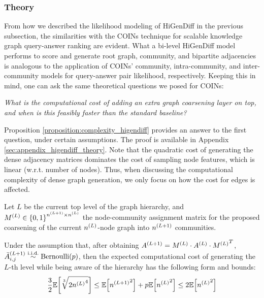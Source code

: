 \begin{itemize}
\end{itemize}

\subsubsection{Theory}
From how we described the likelihood modeling of HiGenDiff in the previous subsection, the similarities with the COINs technique for scalable knowledge graph query-answer ranking are evident. What a bi-level HiGenDiff model performs to score and generate root graph, community, and bipartite adjacencies is analogous to the application of COINs' community, intra-community, and inter-community models for query-answer pair likelihood, respectively. Keeping this in mind, one can ask the same theoretical questions we posed for COINs: 
\begin{center}
    \emph{What is the computational cost of adding an extra graph coarsening layer on top, and when is this feasibly faster than the standard baseline?}
\end{center}
Proposition \ref{proposition:complexity_higendiff} provides an answer to the first question, under certain assumptions. The proof is available in Appendix \ref{sec:appendix_higendiff_theory}. Note that the quadratic cost of generating the dense adjacency matrices dominates the cost of sampling node features, which is linear (w.r.t. number of nodes). Thus, when discussing the computational complexity of dense graph generation, we only focus on how the cost for edges is affected.

\begin{proposition}
    \label{proposition:complexity_higendiff}
    Let $L$ be the current top level of the graph hierarchy, and $M^{\mathopen{}\left(L\right)} \in \mathopen{}\left\{0,1\right\}^{n^{\mathopen{}\left(L+1\right)}\times n^{\mathopen{}\left(L\right)}}$ the node-community assignment matrix for the proposed coarsening of the current $n^{\mathopen{}\left(L\right)}$-node graph into $n^{\mathopen{}\left(L+1\right)}$ communities. 
    
    Under the assumption that, after obtaining $A^{\mathopen{}\left(L+1\right)}=M^{\mathopen{}\left(L\right)} \cdot A^{\mathopen{}\left(L\right)} \cdot {M^{\mathopen{}\left(L\right)}}^T$, $\bar{A}_{i,j}^{\mathopen{}\left(L+1\right)} \overset{\text{i.i.d.}}{\sim} \text{Bernoulli}\mathopen{}\left(p\right)$, then the expected computational cost of generating the $L$-th level while being aware of the hierarchy has the following form and bounds:
    \begin{equation}
         \frac{3}{2}\mathbb{E}\mathopen{}\left[\sqrt[3]{2{n^{\mathopen{}\left(L\right)}}^4}\right] \leq \mathbb{E}\mathopen{}\left[{n^{\mathopen{}\left(L+1\right)}}^2\right] + p \mathbb{E}\mathopen{}\left[{n^{\mathopen{}\left(L\right)}}^2\right] \leq 2\mathbb{E}\mathopen{}\left[{n^{\mathopen{}\left(L\right)}}^2\right]
    \end{equation}
\end{proposition}

